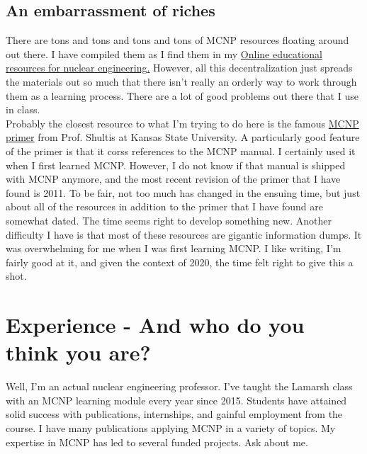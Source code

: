 \documentclass[11pt,a4paper]{article}
\begin{document}
\subsection{An embarrassment of riches}
\noindent There are tons and tons and tons and tons of MCNP resources floating around out there. I have compiled them as I find them in my \href{https://courses.lumenlearning.com/uidaho-nuclear/}{Online educational resources for nuclear engineering.} However, all this decentralization just spreads the materials out so much that there isn't really an orderly way to work through them as a learning process. There are a lot of good problems out there that I use in class. \\

\noindent Probably the closest resource to what I'm trying to do here is the famous \href{https://www.mne.k-state.edu/~jks/MCNPprmr.pdf}{MCNP primer} from Prof. Shultis at Kansas State University. A particularly good feature of the primer is that it corss references to the MCNP manual. I certainly used it when I first learned MCNP. However, I do not know if that manual is shipped with MCNP anymore, and the most recent revision of the primer that I have found is 2011. To be fair, not too much has changed in the ensuing time, but just about all of the resources in addition to the primer that I have found are somewhat dated. The time seems right to develop something new. Another difficulty I have is that most of these resources are gigantic information dumps. It was overwhelming for me when I was first learning MCNP. I like writing, I'm fairly good at it, and given the context of 2020, the time felt right to give this a shot. \\

\newpage


\section{Experience - And who do you think you are?} \label{experience}
\noindent Well, I'm an actual nuclear engineering professor. I've taught the Lamarsh class with an MCNP learning module every year since 2015. Students have attained solid success with publications, internships, and gainful employment from the course. I have many publications applying MCNP in a variety of topics. My expertise in MCNP has led to several funded projects. Ask about me. \\
\end{document}
